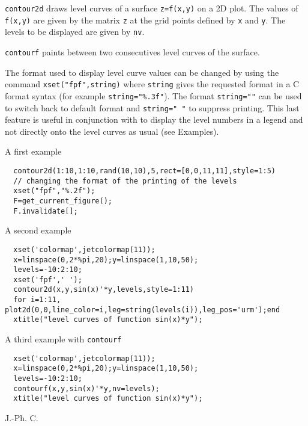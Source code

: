 \begin{mandescription}
  \verb!contour2d! draws level curves of a surface
  \verb!z=f(x,y)! on a 2D plot. The values of \verb!f(x,y)! are
  given by the matrix \verb!z! at the grid points defined by
  \verb!x! and \verb!y!. The levels to be displayed are given by \verb!nv!.

  \verb!contourf! paints between two consecutives level curves of the surface.

  The format used to display level curve values can be changed by
  using the command \verb!xset("fpf",string)! where \verb!string!
  gives the requested format in a C format syntax (for example
  \verb!string="%.3f"!). The format \verb!string=""! can be used
  to switch back to default format and \verb!string=" "! to suppress printing. This
  last feature is useful in conjunction with  to display
  the level numbers in a legend and not directly onto the level curves as
  usual (see Examples).
\end{mandescription}

\begin{examples}

\noindent A first example

\begin{Verbatim}
  contour2d(1:10,1:10,rand(10,10),5,rect=[0,0,11,11],style=1:5)
  // changing the format of the printing of the levels
  xset("fpf","%.2f");
  F=get_current_figure();
  F.invalidate[];
\end{Verbatim}

\noindent A second example

\begin{Verbatim}
  xset('colormap',jetcolormap(11));
  x=linspace(0,2*%pi,20);y=linspace(1,10,50);
  levels=-10:2:10;
  xset('fpf',' ');
  contour2d(x,y,sin(x)'*y,levels,style=1:11)
  for i=1:11, plot2d(0,0,line_color=i,leg=string(levels(i)),leg_pos='urm');end
  xtitle("level curves of function sin(x)*y");
\end{Verbatim}

\noindent A third example with \verb!contourf!

\begin{Verbatim}
  xset('colormap',jetcolormap(11));
  x=linspace(0,2*%pi,20);y=linspace(1,10,50);
  levels=-10:2:10;
  contourf(x,y,sin(x)'*y,nv=levels);
  xtitle("level curves of function sin(x)*y");
\end{Verbatim}

\end{examples}
\begin{manseealso}
    
\end{manseealso}
\begin{authors}
  J.-Ph. C.
\end{authors}
